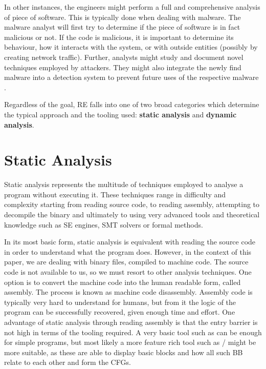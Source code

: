 In other instances, the engineers might perform a full and comprehensive analysis of piece of software. This is typically done when dealing with malware. The malware analyst will first try to determine if the piece of software is in fact malicious or not. If the code is malicious, it is important to determine its behaviour, how it interacts with the system, or with outside entities (possibly by creating network traffic). Further, analysts might study and document novel techniques employed by attackers. They might also integrate the newly find malware into a detection system to prevent future uses of the respective malware \cite{malware_crowdstrike}.

Regardless of the goal, RE falls into one of two broad categories which determine the typical approach and the tooling used: \textbf{static analysis} and \textbf{dynamic analysis}.

\section{Static Analysis}

Static analysis represents the multitude of techniques employed to analyse a program without executing it. These techniques range in difficulty and complexity starting from reading source code, to reading assembly, attempting to decompile the binary and ultimately to using very advanced tools and theoretical knowledge such as \gls{SE} engines, SMT solvers or formal methods. %

In its most basic form, static analysis is equivalent with reading the source code in order to understand what the program does. However, in the context of this paper, we are dealing with binary files, compiled to machine code. The source code is not available to us, so we must resort to other analysis techniques. One option is to convert the machine code into the human readable form, called assembly. The process is known as machine code disassembly. Assembly code is typically very hard to understand for humans, but from it the logic of the program can be successfully recovered, given enough time and effort. One advantage of static analysis through reading assembly is that the entry barrier is not high in terms of the tooling required. A very basic tool such as  \cite{TODO} can be enough for simple programs, but most likely a more feature rich tool such as / \cite{TODO} might be more suitable, as these are able to display basic blocks and how all such \gls{BB} relate to each other and form the \glspl{CFG}.

